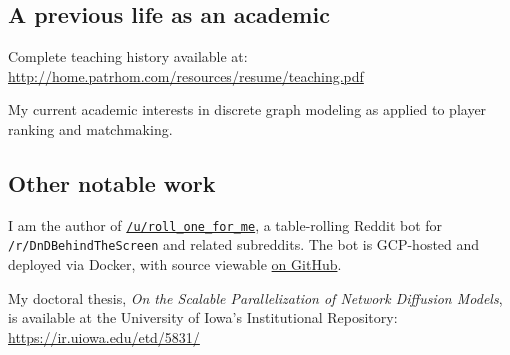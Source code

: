 \documentclass[10pt,letterpaper]{article}
\newcommand\ttt\texttt
\renewenvironment{itemize}{
  \begin{list}{}{
    \setlength{\leftmargin}{1.5em}
    \setlength{\itemsep}{0.25em}
    \setlength{\parskip}{0pt}
    \setlength{\parsep}{0.25em}
  }
}{
  \end{list}
}
\begin{document}
\subsection*{A previous life as an academic}
\begin{itemize}
  \item

  \item

  \item

  \item

  \item Complete teaching history available at: \url{http://home.patrhom.com/resources/resume/teaching.pdf}
  
  \item My current academic interests in discrete graph modeling as applied to player ranking and matchmaking.
\end{itemize}

\subsection*{Other notable work}
\begin{itemize}
  \item I am the author of \href{https://www.reddit.com/user/roll_one_for_me}{\ttt{/u/roll\_one\_for\_me}},
    a table-rolling Reddit bot for \ttt{/r/DnDBehindTheScreen} and related subreddits.
    The bot is GCP-hosted and deployed via Docker, with source viewable \href{https://github.com/PurelyApplied/roll_one_for_me/}{on GitHub}.

  \item My doctoral thesis, {\em On the Scalable Parallelization of Network Diffusion Models},
    is available at the University of Iowa's Institutional Repository:  \url{https://ir.uiowa.edu/etd/5831/}
\end{itemize}
\end{document}
